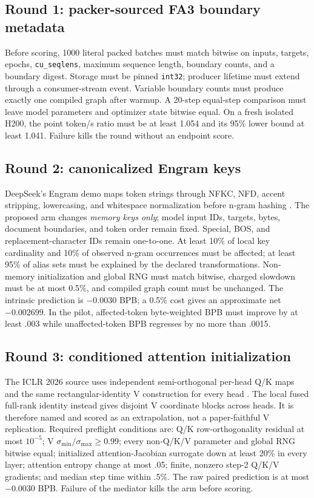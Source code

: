 \documentclass{article}
\begin{document}
\subsection{Round 1: packer-sourced FA3 boundary metadata}

Before scoring, 1000 literal packed batches must match bitwise on inputs,
targets, epochs, \texttt{cu\_seqlens}, maximum sequence length, boundary
counts, and a boundary digest.  Storage must be pinned \texttt{int32};
producer lifetime must extend through a consumer-stream event.  Variable
boundary counts must produce exactly one compiled graph after warmup.
A 20-step equal-step comparison must leave model parameters and optimizer
state bitwise equal.  On a fresh isolated H200, the point token/s ratio must
be at least 1.054 and its 95\% lower bound at least 1.041.  Failure kills the
round without an endpoint score.

\subsection{Round 2: canonicalized Engram keys}

DeepSeek's Engram demo maps token strings through NFKC, NFD, accent stripping,
lowercasing, and whitespace normalization before n-gram hashing
\cite{deepseek2026engram,deepseek2026engramcode}.  The proposed arm changes \emph{memory keys
only}; model input IDs, targets, bytes, document boundaries, and token order
remain fixed.  Special, BOS, and replacement-character IDs remain one-to-one.
At least 10\% of local key cardinality and 10\% of observed n-gram
occurrences must be affected; at least 95\% of alias sets must be explained by
the declared transformations.  Non-memory initialization and global RNG must
match bitwise, charged slowdown must be at most 0.5\%, and compiled graph
count must be unchanged.  The intrinsic prediction is $-0.0030$ BPB; a
0.5\% cost gives an approximate net $-0.002699$.  In the pilot, affected-token
byte-weighted BPB must improve by at least .003 while unaffected-token BPB
regresses by no more than .0015.

\subsection{Round 3: conditioned attention initialization}

The ICLR 2026 source uses independent semi-orthogonal per-head Q/K maps and
the same rectangular-identity V construction for every head
\cite{saratchandran2026conditioned}.  The local fused full-rank identity
instead gives disjoint V coordinate blocks across heads.  It is therefore
named and scored as an extrapolation, not a paper-faithful V replication.
Required preflight conditions are: Q/K row-orthogonality residual at most
$10^{-5}$; V $\sigma_{\min}/\sigma_{\max}\geq0.99$; every non-Q/K/V parameter
and global RNG bitwise equal; initialized attention-Jacobian surrogate down
at least 20\% in every layer; attention entropy change at most .05; finite,
nonzero step-2 Q/K/V gradients; and median step time within .5\%.  The raw
paired prediction is at most $-0.0030$ BPB.  Failure of the mediator kills
the arm before scoring.
\end{document}
